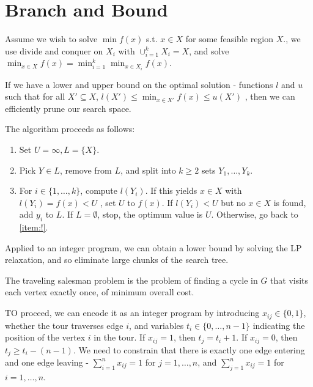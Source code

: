 \section{Branch and Bound}
\label{sec:branch-bound}

\begin{defn}
  \label{sec:branch-bound-1}
  Assume we wish to solve $\min f(x)$ s.t. $x \in X$ for some feasible
  region $X$., we use divide and conquer on $X_{i}$ with
  $\cup_{i=1}^{k} X_{i} = X$, and solve $\min_{x \in X} f(x) =
  \min_{i=1}^{k} \min_{x \in X_{i}} f(x)$.

  If we have a lower and upper bound on the optimal solution -
  functions $l$ and $u$ such that for all $X' \subseteq X$, $l(X')
  \leq \min_{x \in X'} f(x) \leq u(X')$ , then we can efficiently
  prune our search space.

  The algorithm proceeds as follows:
  \begin{enumerate}
  \item Set $U = \infty, L = \{ X \} $.
  \item\label{item:1} Pick $Y \in L$, remove from $L$, and split into $k \geq 2$
    sets $Y_{1}, \dots, Y_{k}$.
  \item For $i \in \{ 1, \dots, k \} $, compute $l(Y_{i})$.  If this
    yields $x \in X$ with $l(Y_{i}) = f(x) < U$ , set $U$ to $f(x)$.
    If $l(Y_{i}) < U$ but no $x \in X$ is found, add $y_{i}$ to $L$.
    If $L = \emptyset$, stop, the optimum value is $U$.  Otherwise, go
    back to \ref{item:!}.
  \end{enumerate}
\end{defn}

\begin{thm}
  \label{sec:branch-bound-2}
  Applied to an integer program, we can obtain a lower bound by
  solving the LP relaxation, and so eliminate large chunks of the
  search tree.
\end{thm}

\begin{defn}
  \label{sec:branch-bound-3}
  The traveling salesman problem is the problem of finding a cycle in
  $G$ that visits each vertex exactly once, of minimum overall cost.

  TO proceed, we can encode it as an integer program by introducing
  $x_{ij} \in \{ 0, 1 \} $, whether the tour traverses edge $i$, and
  variables $t_{i} \in \{ 0, \dots, n-1 \} $ indicating the position
  of the vertex $i$ in the tour. If $x_{ij} = 1$, then $t_{j} = t_{i}
  + 1$. If $x_{ij} = 0$, then $t_{j} \geq t_{i} - (n-1)$. We need to
  constrain that there is exactly one edge entering and one edge
  leaving - $\sum_{i=1}^{n} x_{ij} = 1$ for $j = 1, \dots, n$, and
  $\sum_{j=1}^{n} x_{ij} = 1$ for $i = 1, \dots, n$.
\end{defn}

